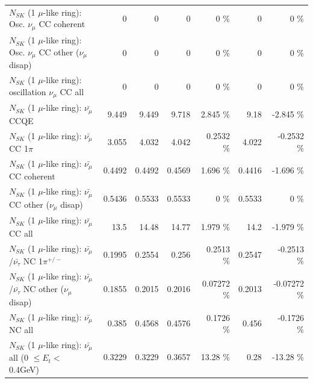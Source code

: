\begin{table}
\begin{tabular}{| l | r | r | r  r | r  r |}
                        $N_{SK}$ (1 $\mu$-like ring): Osc. $\nu_\mu$ CC coherent &               0 &               0 &               0 &        0 \%  &               0 &        0 \%  \\ 
         $N_{SK}$ (1 $\mu$-like ring): Osc. $\nu_\mu$ CC other ($\nu_\mu$ disap) &               0 &               0 &               0 &        0 \%  &               0 &        0 \%  \\ 
                      $N_{SK}$ (1 $\mu$-like ring): oscillation $\nu_\mu$ CC all &               0 &               0 &               0 &        0 \%  &               0 &        0 \%  \\ 
\hline
\hline
                              $N_{SK}$ (1 $\mu$-like ring): $\bar{\nu_\mu}$ CCQE &           9.449 &           9.449 &           9.718 &    2.845 \%  &            9.18 &   -2.845 \%  \\ 
                         $N_{SK}$ (1 $\mu$-like ring): $\bar{\nu_\mu}$ CC 1$\pi$ &           3.055 &           4.032 &           4.042 &   0.2532 \%  &           4.022 &  -0.2532 \%  \\ 
                       $N_{SK}$ (1 $\mu$-like ring): $\bar{\nu_\mu}$ CC coherent &          0.4492 &          0.4492 &          0.4569 &    1.696 \%  &          0.4416 &   -1.696 \%  \\ 
        $N_{SK}$ (1 $\mu$-like ring): $\bar{\nu_\mu}$ CC other ($\nu_\mu$ disap) &          0.5436 &          0.5533 &          0.5533 &        0 \%  &          0.5533 &        0 \%  \\ 
                          $N_{SK}$ (1 $\mu$-like ring): $\bar{\nu_{\mu}}$ CC all &            13.5 &           14.48 &           14.77 &    1.979 \%  &            14.2 &   -1.979 \%  \\ 
\hline
  $N_{SK}$ (1 $\mu$-like ring): $\bar{\nu_\mu}$/$\bar{\nu_\tau}$ NC 1$\pi^{+/-}$ &          0.1995 &          0.2554 &           0.256 &   0.2513 \%  &          0.2547 &  -0.2513 \%  \\ 
$N_{SK}$ (1 $\mu$-like ring): $\bar{\nu_\mu}$/$\bar{\nu_\tau}$ NC other ($\nu_\mu$ disap) &          0.1855 &          0.2015 &          0.2016 &  0.07272 \%  &          0.2013 & -0.07272 \%  \\ 
                          $N_{SK}$ (1 $\mu$-like ring): $\bar{\nu_{\mu}}$ NC all &           0.385 &          0.4568 &          0.4576 &   0.1726 \%  &           0.456 &  -0.1726 \%  \\ 
\hline
   $N_{SK}$ (1 $\mu$-like ring): $\bar{\nu_{\mu}}$ all (0 $\leq E_{t} <$ 0.4GeV) &          0.3229 &          0.3229 &          0.3657 &    13.28 \%  &            0.28 &   -13.28 \%  \\ 

\end{tabular}
\end{table}
